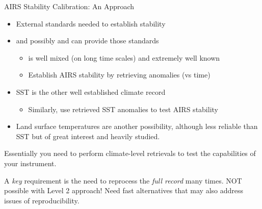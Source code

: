 \documentclass[10pt,t]{beamer}
\begin{document}
\begin{frame}[label={sec:orgf4ace31}]{AIRS Stability Calibration: An Approach}
\begin{itemize}
\item External standards needed to establish stability
\item \cd and possibly \nitrous and \methane can provide those standards
\begin{itemize}
\item \cd is well mixed (on long time scales) and extremely well known
\item Establish AIRS stability by retrieving \cd anomalies (vs time)
\end{itemize}
\item SST is the other well established climate record
\begin{itemize}
\item Similarly, use retrieved SST anomalies to test AIRS stability
\end{itemize}
\item Land surface temperatures are another possibility, although less reliable than SST but of great interest and heavily studied.
\end{itemize}

Essentially you need to perform climate-level retrievals to test the capabilities of your instrument.  

A \emph{key} requirement is the need to reprocess the \emph{full record} many times.  NOT possible with Level 2 approach!  Need fast alternatives that may also address issues of reproducibility.
\end{frame}
\end{document}
